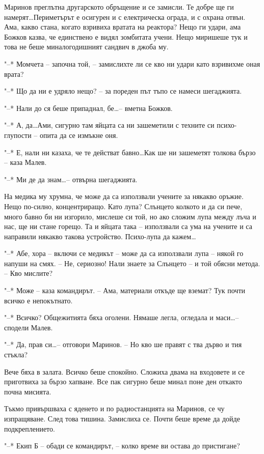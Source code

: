 \documentclass[ebook,openany,12pt]{memoir}
\begin{document}
Маринов преглътна другарското обръщение и се замисли. Те добре ще ги намерят\ldots Периметърът е осигурен и с електрическа ограда, и с охрана отвън. Ама, какво стана, когато взривиха вратата на реактора? Нещо ги удари, ама Божков казва, че единствено е видял зомбитата учени. Нещо миришеше тук и това не беше миналогодишният сандвич в джоба му.

"--* Момчета -- започна той, – замислихте ли се кво ни удари като взривихме оная врата? 

"--* Що да ни е удряло нещо? – за пореден път тъпо се намеси шегаджията.

"--* Нали до ся беше припаднал, бе\ldots – вметна Божков.

"--* А, да\ldots Ами, сигурно там яйцата са ни зашеметили с техните си психо-глупости – опита да се измъкне оня.

"--* Е, нали ни казаха, че те действат бавно\ldots Как ше ни зашеметят толкова бързо – каза Малев.

"--* Ми де да знам\ldots – отвърна шегаджията.

На медика му хрумна, че може да са използвали учените за някакво оръжие. Нещо по-силно, концентриращо. Като лупа? Слънцето колкото и да си пече, много бавно би ни изгорило, мислеше си той, но ако сложим лупа между лъча и нас, ще ни стане горещо. Та и яйцата така – използвали са ума на учените и са направили някакво такова устройство. Психо-лупа да кажем\ldots

"--* Абе, хора – включи се медикът – може да са използвали лупа – някой го напуши на смях. – Не, сериозно! Нали знаете за Слънцето – и той обясни метода. – Кво мислите?

"--* Може – каза командирът. – Ама, материали откъде ще вземат? Тук почти всичко е непокътнато.

"--* Всичко? Общежитията бяха оголени. Нямаше легла, огледала и маси\ldots – сподели Малев.

"--* Да, прав си\ldots – отговори Маринов. – Но кво ше правят с тва дърво и тия стъкла?

Вече бяха в залата. Всичко беше спокойно. Сложиха двама на входовете и се приготвиха за бързо хапване. Все пак сигурно беше минал поне ден откакто почна мисията.

Тъкмо привършваха с яденето и по радиостанцията на Маринов, се чу изпращяване. След това тишина. Замислиха се. Почти беше време да дойде подкреплението.

"--* Екип Б – обади се командирът, – колко време ви остава до пристигане?
\end{document}
